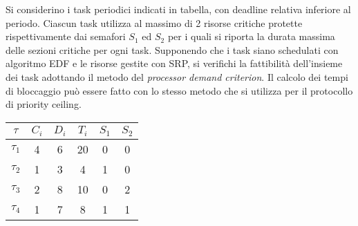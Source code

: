 \begin{Esercizio5}

Si considerino i task periodici indicati in tabella, con deadline relativa inferiore 
al periodo. Ciascun task utilizza al massimo di 2 risorse critiche protette 
rispettivamente dai semafori $S_1$ ed $S_2$ per i quali si riporta la durata massima 
delle sezioni critiche per ogni task. Supponendo che i task siano schedulati con 
algoritmo EDF e le risorse gestite con SRP, si verifichi la fattibilità dell'insieme 
dei task adottando il metodo del \textit{processor demand criterion}. Il calcolo dei 
tempi di bloccaggio può essere fatto con lo stesso metodo che si utilizza per il 
protocollo di priority ceiling.

\begin{table}[!h]
\centering
\begin{tabular}{|c|c|c|c|c|c|}
\hline
$\tau$ & $C_i$ & $D_i$ & $T_i$ & $S_1$ & $S_2$ \\
\hline
$\tau_1$ & 4 & 6 & 20 & 0 & 0 \\
\hline
$\tau_2$ & 1 & 3 & 4 & 1 & 0 \\
\hline
$\tau_3$ & 2 & 8 & 10 & 0 & 2 \\
\hline
$\tau_4$ & 1 & 7 & 8 & 1 & 1 \\
\hline
\end{tabular}
\label{tab:task_edf_srp}
\end{table}

\end{Esercizio5}



